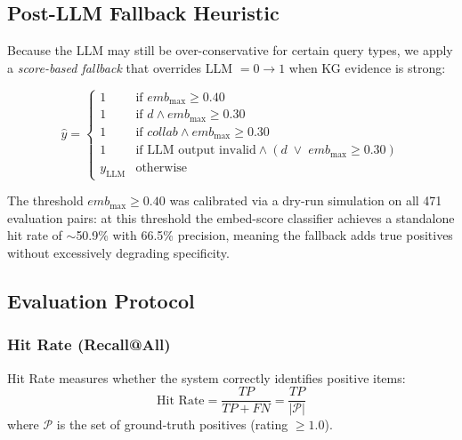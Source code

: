 \documentclass[12pt,a4paper]{article}
\begin{document}
\subsection{Post-LLM Fallback Heuristic}

Because the LLM may still be over-conservative for certain query types,
we apply a \emph{score-based fallback} that overrides LLM $= 0 \to 1$
when KG evidence is strong:

\begin{equation}
  \hat{y} =
  \begin{cases}
    1 & \text{if } \textit{emb}_{\max} \geq 0.40 \\
    1 & \text{if } d \wedge \textit{emb}_{\max} \geq 0.30 \\
    1 & \text{if } \textit{collab} \wedge \textit{emb}_{\max} \geq 0.30 \\
    1 & \text{if LLM output invalid} \wedge
        (d \;\vee\; \textit{emb}_{\max} \geq 0.30) \\
    y_{\text{LLM}} & \text{otherwise}
  \end{cases}
  \label{eq:fallback}
\end{equation}

The threshold $\textit{emb}_{\max} \geq 0.40$ was calibrated via a dry-run
simulation on all 471 evaluation pairs: at this threshold the embed-score
classifier achieves a standalone hit rate of $\sim$50.9\% with 66.5\% precision,
meaning the fallback adds true positives without excessively degrading specificity.

\subsection{Evaluation Protocol}

\subsubsection{Hit Rate (Recall@All)}
Hit Rate measures whether the system correctly identifies positive items:
\begin{equation}
  \text{Hit Rate} = \frac{TP}{TP + FN} = \frac{TP}{|\mathcal{P}|}
\end{equation}
where $\mathcal{P}$ is the set of ground-truth positives (rating $\geq 1.0$).
\end{document}
